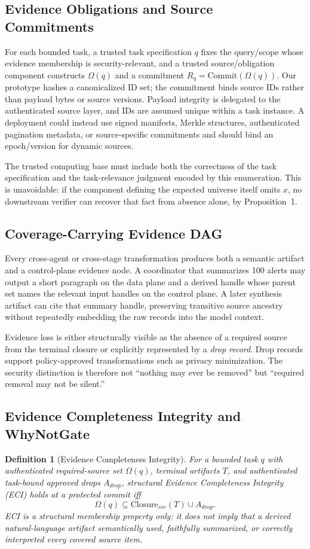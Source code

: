 \documentclass[journal,compsoc]{IEEEtran}
\newtheorem{definition}{Definition}
\begin{document}
\subsection{Evidence Obligations and Source Commitments}
For each bounded task, a trusted task specification $q$ fixes the query/scope whose evidence membership is security-relevant, and a trusted source/obligation component constructs $\Omega(q)$ and a commitment $R_q=\mathrm{Commit}(\Omega(q))$. Our prototype hashes a canonicalized ID set; the commitment binds source IDs rather than payload bytes or source versions. Payload integrity is delegated to the authenticated source layer, and IDs are assumed unique within a task instance. A deployment could instead use signed manifests, Merkle structures, authenticated pagination metadata, or source-specific commitments and should bind an epoch/version for dynamic sources.

The trusted computing base must include both the correctness of the task specification and the task-relevance judgment encoded by this enumeration. This is unavoidable: if the component defining the expected universe itself omits $x$, no downstream verifier can recover that fact from absence alone, by Proposition~1.

\subsection{Coverage-Carrying Evidence DAG}
Every cross-agent or cross-stage transformation produces both a semantic artifact and a control-plane evidence node. A coordinator that summarizes 100 alerts may output a short paragraph on the data plane and a derived handle whose parent set names the relevant input handles on the control plane. A later synthesis artifact can cite that summary handle, preserving transitive source ancestry without repeatedly embedding the raw records into the model context.

Evidence loss is either structurally visible as the absence of a required source from the terminal closure or explicitly represented by a \emph{drop record}. Drop records support policy-approved transformations such as privacy minimization. The security distinction is therefore not ``nothing may ever be removed'' but ``required removal may not be silent.''

\subsection{Evidence Completeness Integrity and WhyNotGate}
\begin{definition}[Evidence Completeness Integrity]
For a bounded task $q$ with authenticated required-source set $\Omega(q)$, terminal artifacts $T$, and authenticated task-bound approved drops $A_{drop}$, structural Evidence Completeness Integrity (ECI) holds at a protected commit iff
\[
\Omega(q)\subseteq \mathrm{Closure}_{src}(T)\cup A_{drop}.
\]
ECI is a structural membership property only: it does not imply that a derived natural-language artifact semantically used, faithfully summarized, or correctly interpreted every covered source item.
\end{definition}
\end{document}
